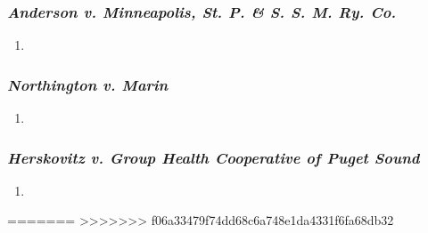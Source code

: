 \subsubsection{\emph{Anderson v. Minneapolis, St. P. \& S. S. M. Ry. Co.}}

\begin{enumerate}
    \item
\end{enumerate}

\subsubsection{\emph{Northington v. Marin}}

\begin{enumerate}
    \item
\end{enumerate}

\subsubsection{\emph{Herskovitz v. Group Health Cooperative of Puget Sound}}

\begin{enumerate}
    \item
\end{enumerate}

=======
>>>>>>> f06a33479f74dd68c6a748e1da4331f6fa68db32
